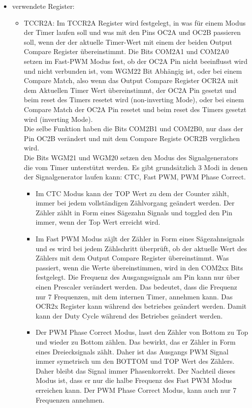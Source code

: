\begin{itemize}
\item verwendete Register:
\begin{itemize}
\item TCCR2A: Im TCCR2A Register wird festgelegt, in was für einem Modus der Timer laufen soll und was mit den Pins OC2A und OC2B passieren soll, wenn der der aktuelle Timer-Wert mit einem der beiden Output Compare Register übereinstimmt. Die Bits COM2A1 und COM2A0 setzen im Fast-PWM Modus fest, ob der OC2A Pin nicht beeinflusst wird und nicht verbunden ist, vom WGM22 Bit Abhängig ist, oder bei einem Compare Match, also wenn das Output Compare Register OCR2A mit dem Aktuellen Timer Wert übereinstimmt, der OC2A Pin gesetzt und beim reset des Timers resetet wird (non-inverting Mode), oder bei einem Compare Match der OC2A Pin resetet und beim reset des Timers gesetzt wird (inverting Mode). \\ Die selbe Funktion haben die Bits COM2B1 und COM2B0, nur dass der Pin OC2B verändert und mit dem Compare Registe OCR2B verglichen wird. \\
Die Bits WGM21 und WGM20 setzen den Modus des Signalgenerators die vom Timer unterstützt werden. Es gibt grundsätzlich 3 Modi in denen der Signalgenerator laufen kann: CTC, Fast PWM, PWM Phase Correct. \\
\begin{itemize}
\item Im CTC Modus kann der TOP Wert zu dem der Counter zählt, immer bei jedem vollständigen Zählvorgang geändert werden. Der Zähler zählt in Form eines Sägezahn Signals und toggled den Pin immer, wenn der Top Wert erreicht wird.\\
\item Im Fast PWM Modus zäjlt der Zähler in Form eines Sägezahnsignals und es wird bei jedem Zählschritt überprüft, ob der aktuelle Wert des Zählers mit dem Output Compare Register übereinstimmt. Was passiert, wenn die Werte übereinstimmen, wird in den COM2xx Bits festgelegt. Die Frequenz des Ausgangssignals am Pin kann nur über einen Prescaler verändert werden. Das bedeutet, dass die Frequenz nur 7 Frequenzen, mit dem internen Timer, annehmen kann. Das OCR2x Register kann während des betriebes geändert werden. Damit kann der Duty Cycle während des Betriebes geändert werden. \\
\item Der PWM Phase Correct Modus, lasst den Zähler von Bottom zu Top und wieder zu Bottom zählen. Das bewirkt, das er Zähler in Form eines Dreiecksignals zählt. Daher ist das Ausgangs PWM Signal immer symetrisch um den BOTTOM und TOP Wert des Zählers. Daher bleibt das Signal immer Phasenkorrekt. Der Nachteil dieses Modus ist, dass er nur die halbe Frequenz des Fast PWM Modus erreichen kann. Der PWM Phase Correct Modus, kann auch nur 7 Frequenzen annehmen.\\

\end{itemize}
\end{itemize}
\end{itemize}
